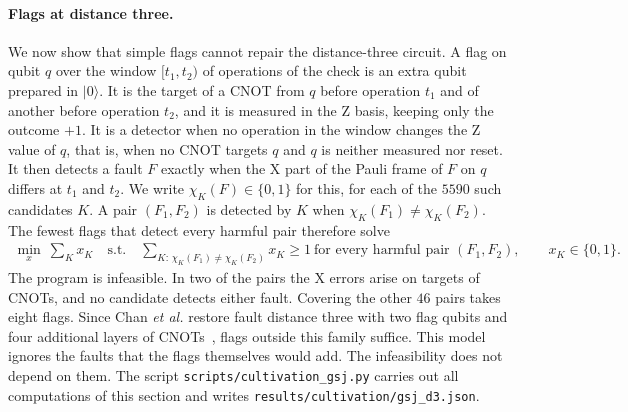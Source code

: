 \documentclass[aps,prl,reprint,twocolumn,amsmath,amssymb,floatfix,nofootinbib,superscriptaddress]{revtex4-2}
\theoremstyle{definition}
\theoremstyle{remark}
\begin{document}
\paragraph*{Flags at distance three.}
We now show that simple flags cannot repair the distance-three circuit. A flag on qubit $q$ over the window $[t_1,t_2)$ of operations of the check is an extra qubit prepared in $|0\rangle$. It is the target of a CNOT from $q$ before operation $t_1$ and of another before operation $t_2$, and it is measured in the Z basis, keeping only the outcome $+1$. It is a detector when no operation in the window changes the Z value of $q$, that is, when no CNOT targets $q$ and $q$ is neither measured nor reset. It then detects a fault $F$ exactly when the X part of the Pauli frame of $F$ on $q$ differs at $t_1$ and $t_2$. We write $\chi_K(F)\in\{0,1\}$ for this, for each of the $5590$ such candidates $K$. A pair $(F_1,F_2)$ is detected by $K$ when $\chi_K(F_1)\neq\chi_K(F_2)$. The fewest flags that detect every harmful pair therefore solve
\begin{align*}
\min_x\ \sum_Kx_K\quad\text{s.t.}\quad\sum_{K:\,\chi_K(F_1)\neq\chi_K(F_2)}x_K\geq1\ \text{for every harmful pair }(F_1,F_2),\qquad x_K\in\{0,1\}.
\end{align*}
The program is infeasible. In two of the pairs the X errors arise on targets of CNOTs, and no candidate detects either fault. Covering the other $46$ pairs takes eight flags. Since Chan \emph{et al.} restore fault distance three with two flag qubits and four additional layers of CNOTs~\cite{chan}, flags outside this family suffice. This model ignores the faults that the flags themselves would add. The infeasibility does not depend on them. The script \texttt{scripts/cultivation\_gsj.py} carries out all computations of this section and writes \texttt{results/cultivation/gsj\_d3.json}.
\end{document}
